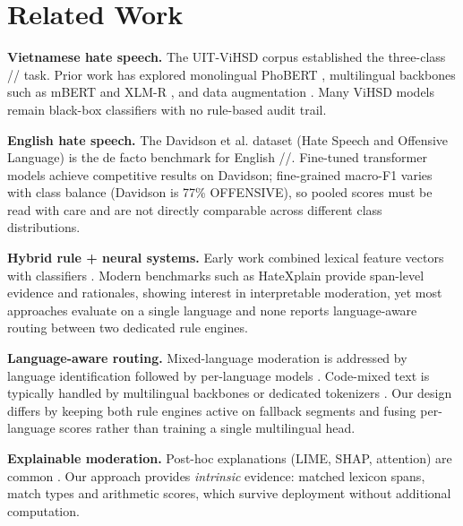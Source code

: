 \section{Related Work}
\label{sec:related_work}

\textbf{Vietnamese hate speech.}  The UIT-ViHSD corpus \cite{luu2021vihsd}
established the three-class \hate{}/\off{}/\clean{} task.  Prior work has
explored monolingual PhoBERT \cite{nguyen2020phobert}, multilingual backbones
such as mBERT and XLM-R \cite{conneau2020xlmr}, and data augmentation
\cite{nguyen2026vicm}.  Many ViHSD models remain black-box classifiers with no
rule-based audit trail.

\textbf{English hate speech.}  The Davidson et al. \cite{davidson2017automated}
dataset (Hate Speech and Offensive Language) is the de facto benchmark for
English \hate{}/\off{}/\clean{}.  Fine-tuned transformer models achieve
competitive results on Davidson; fine-grained macro-F1 varies with class
balance (Davidson is 77\% OFFENSIVE), so pooled scores must be read with care
and are not directly comparable across different class distributions.

\textbf{Hybrid rule + neural systems.}  Early work combined lexical feature
vectors with classifiers \cite{waseem2016hateful}.  Modern benchmarks such as
HateXplain \cite{mathew2021hatexplain} provide span-level evidence and
rationales, showing interest in interpretable moderation, yet most approaches
evaluate on a single language and none reports language-aware routing between
two dedicated rule engines.

\textbf{Language-aware routing.}  Mixed-language moderation is addressed by
language identification \cite{lui2012langid} followed by per-language models
\cite{conneau2020xlmr}.  Code-mixed text is typically handled by multilingual
backbones or dedicated tokenizers \cite{nguyen2026vicm}.  Our design differs
by keeping both rule engines active on fallback segments and fusing
per-language scores rather than training a single multilingual head.

\textbf{Explainable moderation.}  Post-hoc explanations (LIME, SHAP,
attention) are common \cite{danilevsky2020survey,mathew2021hatexplain}.  Our
approach provides \emph{intrinsic} evidence: matched lexicon spans, match types
and arithmetic scores, which survive deployment without additional computation.
